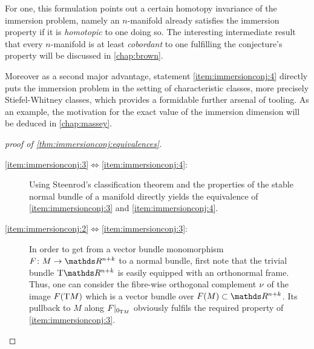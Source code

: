 For one, this formulation points out a certain homotopy invariance of
the immersion problem, namely an $n$-manifold already satisfies the
immersion property if it is \emph{homotopic} to one doing so. 
The interesting intermediate result that every $n$-manifold is
at least \emph{cobordant} to one fulfilling the conjecture's property
will be discussed in \autoref{chap:brown}.

Moreover as a second major advantage, statement
\ref{item:immersionconj:4} directly puts the immersion problem in the
setting of characteristic classes, more precisely Stiefel-Whitney
classes, which provides a formidable further arsenal of tooling.
As an example, the motivation for the exact value of the immersion
dimension will be deduced in \autoref{chap:massey}.

\begin{proof}[proof of \autoref{thm:immersionconj:equivalences}]
  \begin{description}
  \item[\ref{item:immersionconj:3}$\Leftrightarrow$\ref{item:immersionconj:4}:]
    Using Steenrod's classification theorem
    and the properties of the stable normal bundle of a manifold
    directly yields the equivalence of \ref{item:immersionconj:3} and
    \ref{item:immersionconj:4}.
  \item[\ref{item:immersionconj:2}$\Leftrightarrow$\ref{item:immersionconj:3}:]
    In order to get from a vector bundle monomorphism
    $F\colon M\to\R^{n+k}$ to a normal bundle, first note that the
    trivial bundle $\T{\R^{n+k}}$ is easily equipped with an
    orthonormal frame. Thus, one can consider the fibre-wise orthogonal
    complement $\nu_{}$ of the image $F(\mathrm{T}M)$ which is a vector bundle over
    $F(M)\subset\R^{n+k}$. Its pullback to $M$ along
    $F|_{0_{\mathrm{T}M}}$ obviously fulfils the required property of
    \ref{item:immersionconj:3}.
    

\end{description}
\end{proof}
